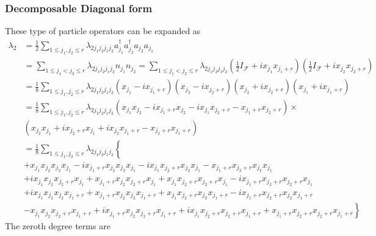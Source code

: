 \documentclass[aps, preprint]{revtex4}
\begin{document}
\subsubsection{Decomposable Diagonal form}
These type of particle operators can be expanded as
\begin{align}\lambda _{2} &  =\frac{1}{2} \sum _{1 \leq j_{1} ,j_{2} \leq r}\lambda _{2 j_{1} j_{2} j_{1} j_{2}} a_{j_{1}}^{ \dag } a_{j_{2}}^{ \dag } a_{j_{2}} a_{j_{1}} \nonumber  \\
 &  =\sum _{1 \leq j_{1} <j_{2} \leq r}\lambda _{2 j_{1} j_{2} j_{1} j_{2}} n_{j_{1}} n_{j_{2}} =\sum _{1 \leq j_{1} <j_{2} \leq r}\lambda _{2 j_{1} j_{2} j_{1} j_{2}} \left (\frac{1}{2} I_{\mathcal{F}} +i x_{j_{1}} x_{j_{1} +r}\right ) \left (\frac{1}{2} I_{\mathcal{F}} +i x_{j_{2}} x_{j_{2} +r}\right ) \\
 &  =\frac{1}{8} \sum _{1 \leq j_{1} ,j_{2} \leq r}\lambda _{2 j_{1} j_{2} j_{1} j_{2}} \left (x_{j_{1}} -i x_{j_{1} +r}\right ) \left (x_{j_{2}} -i x_{j_{2} +r}\right ) \left (x_{j_{2}} +i x_{j_{2} +r}\right ) \left (x_{j_{1}} +i x_{j_{1} +r}\right ) \nonumber  \\
 &  =\frac{1}{8} \sum _{1 \leq j_{1} ,j_{2} \leq r}\lambda _{2 j_{1} j_{2} j_{1} j_{2}} \left (x_{j_{1}} x_{j_{2}} -i x_{j_{1} +r} x_{j_{2}} -i x_{j_{1}} x_{j_{2} +r} -x_{j_{1} +r} x_{j_{2} +r}\right ) \times  \nonumber  \\
 & \left (x_{j_{2}} x_{j_{1}} +i x_{j_{2} +r} x_{j_{1}} +i x_{j_{2}} x_{j_{1} +r} -x_{j_{2} +r} x_{j_{1} +r}\right ) \nonumber  \\
 &  =\frac{1}{8} \sum _{1 \leq j_{1} ,j_{2} \leq r}\lambda _{2 j_{1} j_{2} j_{1} j_{2}}\left \{\text{}\right . \nonumber  \\
 &  +x_{j_{1}} x_{j_{2}} x_{j_{2}} x_{j_{1}} -i x_{j_{1} +r} x_{j_{2}} x_{j_{2}} x_{j_{1}} -i x_{j_{1}} x_{j_{2} +r} x_{j_{2}} x_{j_{1}} -x_{j_{1} +r} x_{j_{2} +r} x_{j_{2}} x_{j_{1}} \nonumber  \\
 &  +i x_{j_{1}} x_{j_{2}} x_{j_{2} +r} x_{j_{1}} +x_{j_{1} +r} x_{j_{2}} x_{j_{2} +r} x_{j_{1}} +x_{j_{1}} x_{j_{2} +r} x_{j_{2} +r} x_{j_{1}} -i x_{j_{1} +r} x_{j_{2} +r} x_{j_{2} +r} x_{j_{1}} \nonumber  \\
 &  +i x_{j_{1}} x_{j_{2}} x_{j_{2}} x_{j_{1} +r} +x_{j_{1} +r} x_{j_{2}} x_{j_{2}} x_{j_{1} +r} +x_{j_{1}} x_{j_{2} +r} x_{j_{2}} x_{j_{1} +r} -i x_{j_{1} +r} x_{j_{2} +r} x_{j_{2}} x_{j_{1} +r} \nonumber  \\
 &  -\left .x_{j_{1}} x_{j_{2}} x_{j_{2} +r} x_{j_{1} +r} +i x_{j_{1} +r} x_{j_{2}} x_{j_{2} +r} x_{j_{1} +r} +i x_{j_{1}} x_{j_{2} +r} x_{j_{2} +r} x_{j_{1} +r} +x_{j_{1} +r} x_{j_{2} +r} x_{j_{2} +r} x_{j_{1} +r}\right \}\end{align}The zeroth degree terms are
\end{document}
